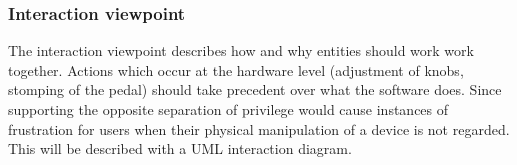             
            

        
    \subsubsection{Interaction viewpoint}
        The interaction viewpoint describes how and why entities should work work together.
        Actions which occur at the hardware level (adjustment of knobs, stomping of the pedal) should take precedent over what the software does. Since supporting the opposite separation of privilege would cause instances of frustration for users when their physical manipulation of a device is not regarded.
        This will be described with a UML interaction diagram.
    
        
        
            

            
            

